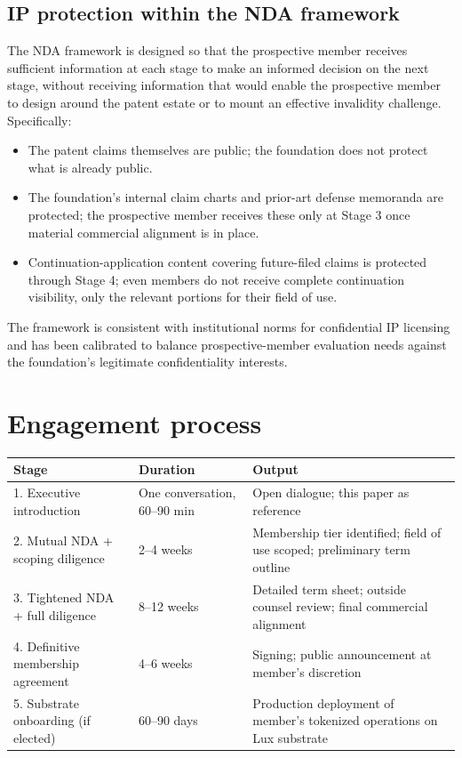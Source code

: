 \documentclass[11pt,letterpaper]{article}
\begin{document}
\subsection{IP protection within the NDA framework}

The NDA framework is designed so that the prospective member receives sufficient information at each stage to make an informed decision on the next stage, without receiving information that would enable the prospective member to design around the patent estate or to mount an effective invalidity challenge. Specifically:

\begin{itemize}
\item The patent claims themselves are public; the foundation does not protect what is already public.
\item The foundation's internal claim charts and prior-art defense memoranda are protected; the prospective member receives these only at Stage 3 once material commercial alignment is in place.
\item Continuation-application content covering future-filed claims is protected through Stage 4; even members do not receive complete continuation visibility, only the relevant portions for their field of use.
\end{itemize}

The framework is consistent with institutional norms for confidential IP licensing and has been calibrated to balance prospective-member evaluation needs against the foundation's legitimate confidentiality interests.

\section{Engagement process}

\begin{longtable}{lll}
\toprule
\textbf{Stage} & \textbf{Duration} & \textbf{Output} \\
\midrule
1. Executive introduction & One conversation, 60--90 min & Open dialogue; this paper as reference \\
2. Mutual NDA + scoping diligence & 2--4 weeks & Membership tier identified; field of use scoped; preliminary term outline \\
3. Tightened NDA + full diligence & 8--12 weeks & Detailed term sheet; outside counsel review; final commercial alignment \\
4. Definitive membership agreement & 4--6 weeks & Signing; public announcement at member's discretion \\
5. Substrate onboarding (if elected) & 60--90 days & Production deployment of member's tokenized operations on Lux substrate \\
\bottomrule
\end{longtable}
\end{document}
